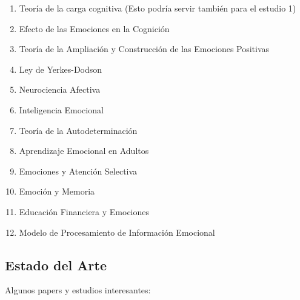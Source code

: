 \documentclass{article}
\begin{document}
\begin{enumerate}
    \item Teoría de la carga cognitiva (Esto podría servir también para el estudio 1) 
    \item Efecto de las Emociones en la Cognición
    \item Teoría de la Ampliación y Construcción de las Emociones Positivas
    \item Ley de Yerkes-Dodson
    \item Neurociencia Afectiva
    \item Inteligencia Emocional
    \item Teoría de la Autodeterminación
    \item Aprendizaje Emocional en Adultos
    \item Emociones y Atención Selectiva
    \item Emoción y Memoria
    \item Educación Financiera y Emociones
    \item Modelo de Procesamiento de Información Emocional 
\end{enumerate}

\subsection{Estado del Arte}
Algunos papers y estudios interesantes: 
\end{document}
